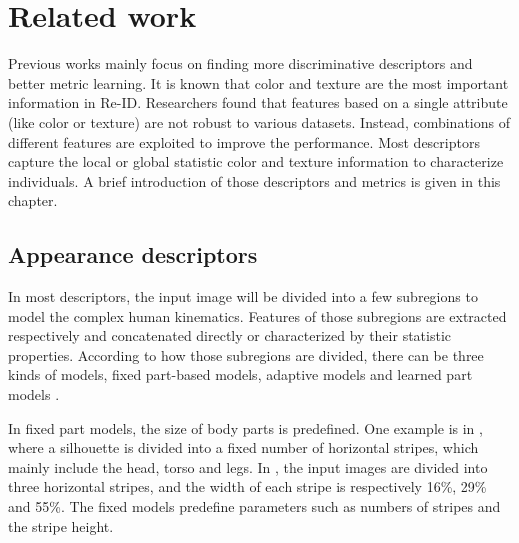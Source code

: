 \chapter{Related work}
Previous works mainly focus on finding more discriminative descriptors and better metric learning. It is known that color and texture are the most important information in Re-ID. Researchers found that features based on a single attribute (like color or texture) are not robust to various datasets. Instead, combinations of different features are exploited to improve the performance. Most descriptors capture the local or global statistic color and texture information to characterize individuals. A brief introduction of those descriptors and metrics is given in this chapter.

\section{Appearance descriptors}
In most descriptors, the input image will be divided into a few subregions to model the complex human kinematics. Features of those subregions are extracted respectively and concatenated directly or characterized by their statistic properties. According to how those subregions are divided, there can be three kinds of models, fixed part-based models, adaptive models and learned part models \cite{Appearancedesc}. 

In fixed part models, the size of body parts is predefined. One example is in \cite{ImportantFeatures, PRDC, REIDSVM}, where a silhouette is divided into a fixed number of horizontal stripes, which mainly include the head, torso and legs. In \cite{AppBasedREID}, the input images are divided into three horizontal stripes, and the width of each stripe is respectively 16\%, 29\% and 55\%.  The fixed models predefine parameters such as numbers of stripes and the stripe height. 

